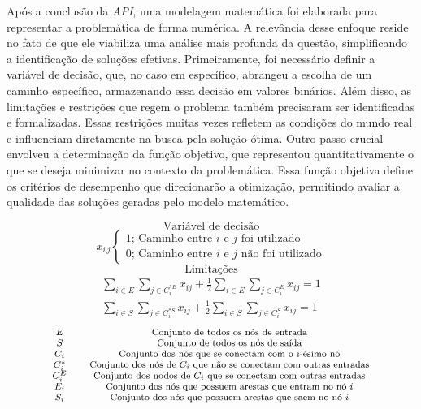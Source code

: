 Após a conclusão da \emph{API}, uma modelagem matemática foi elaborada
para representar a problemática de forma numérica. A relevância desse
enfoque reside no fato de que ele viabiliza uma análise mais profunda da
questão, simplificando a identificação de soluções efetivas.
Primeiramente, foi necessário definir a variável de decisão, que, no
caso em específico, abrangeu a escolha de um caminho específico,
armazenando essa decisão em valores binários. Além disso, as limitações
e restrições que regem o problema também precisaram ser identificadas e
formalizadas. Essas restrições muitas vezes refletem as condições do
mundo real e influenciam diretamente na busca pela solução ótima. Outro
passo crucial envolveu a determinação da função objetivo, que
representou quantitativamente o que se deseja minimizar no contexto da
problemática. Essa função objetiva define os critérios de desempenho que
direcionarão a otimização, permitindo avaliar a qualidade das soluções
geradas pelo modelo matemático.

\[
\text{Variável de decisão}
\] \[
x_{i\,j} \begin{cases}
    1;\, \text{Caminho entre $i$ e $j$ foi utilizado} \\ 
    0;\, \text{Caminho entre $i$ e $j$ não foi utilizado}
\end{cases}
\] \[
\text{Limitações}
\] \[
\begin{matrix}
    \sum_{i \in E }^{} \sum_{j \in C_{i}^{\ast E} }^{} x_{ij} + \frac{1}{2}\sum_{i \in E }^{} \sum_{j \in C_{i}^{ E} }^{}  x_{ij} = 1 \\
    \sum_{i \in S }^{} \sum_{j \in C_{i}^{\ast S} }^{} x_{ij} + \frac{1}{2}\sum_{i \in S }^{} \sum_{j \in C_{i}^{ S} }^{} x_{ij} = 1
\end{matrix}
\] \[
\footnotesize{
    \begin{matrix}
        E && \text{Conjunto de todos os nós de entrada} \\ 
        S && \text{Conjunto de todos os nós de saída} \\ 
        C_{i} && \text{Conjunto dos nós que se conectam com o $i$-ésimo nó} \\ 
        C_{i}^{*} && \text{Conjunto dos nós de $C_{i}$ que não se conectam com outras entradas} \\ 
        C_{i}^{E} && \text{Conjunto dos nodos de $C_{i}$ que se conectam com outras entradas} \\ 
        E_{i} && \text{Conjunto dos nós que possuem arestas que entram no nó $i$} \\ 
        S_{i} && \text{Conjunto dos nós que possuem arestas que saem no nó $i$}
    \end{matrix}
}
\]

